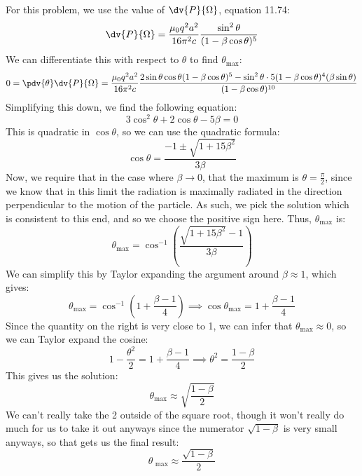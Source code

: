 \documentclass[10pt]{article}
\begin{document}
	\begin{solution}
		For this problem, we use the value of \( \dv{P}{\Omega} \), equation 11.74:
		\[
			\dv{P}{\Omega} = \frac{\mu_0 q^2 a^2}{16 \pi^2 c} \frac{\sin^2 \theta}{(1 - \beta \cos \theta)^{5}}
		\]
		We can differentiate this with respect to \( \theta \) to find \( \theta_\text{max} \):
		\[
			0 = \pdv{\theta} \dv{P}{\Omega} = \frac{\mu_0 q^2 a^2}{16 \pi^2 c} \frac{2 \sin \theta \cos \theta (1
			- \beta \cos \theta)^{5} - \sin^2 \theta \cdot 5(1 - \beta \cos \theta)^{4} (\beta \sin
		\theta)}{(1 - \beta \cos \theta)^{10}}
		\]
		Simplifying this down, we find the following equation:
		\[
			3 \cos^2 \theta + 2 \cos \theta - 5 \beta = 0
		\]
		This is quadratic in \( \cos \theta \), so we can use the quadratic formula:
		\[
			\cos \theta = \frac{-1 \pm \sqrt{1 + 15 \beta^2}}{3 \beta}
		\]
		Now, we require that in the case where \( \beta \to 0 \), that the maximum is \( \theta =
		\frac{\pi}{2} \), since we know that in this limit the radiation is maximally radiated in the
		direction perpendicular to the motion of the particle. As such, we pick the solution which is
		consistent to this end, and so we choose the positive sign here. Thus, \( \theta_\text{max} \) is:
		\[
			\theta_\text{max} = \cos ^{-1}\left( \frac{\sqrt{1 + 15 \beta^2} - 1}{3 \beta} \right)
		\]
		We can simplify this by Taylor expanding the argument around \( \beta \approx 1 \), which gives:
		\[
			\theta_\text{max} = \cos ^{-1}\left( 1 + \frac{\beta - 1}{4} \right) \implies \cos \theta_\text{max}
			= 1 + \frac{\beta - 1}{4}
		\]
		Since the quantity on the right is very close to 1, we can infer that \( \theta_\text{max} \approx 0
		\), so we can Taylor expand the cosine:
		\[
			1 - \frac{\theta^2}{2} = 1 + \frac{\beta - 1}{4} \implies \theta^2 =\frac{1 - \beta}{2}
		\]
		This gives us the solution:
		\[
			\theta_\text{max} \approx \sqrt{\frac{1 - \beta}{2}}
		\]
		We can't really take the 2 outside of the square root, though it won't really do much for us to take
		it out anyways since the numerator \( \sqrt{1 - \beta} \) is very small anyways, so that gets us the
		final result:
		\[
			\theta_\text{ max} \approx \frac{\sqrt{1 - \beta}}{2}
		\]
	\end{solution}

	\pagebreak
\end{document}

